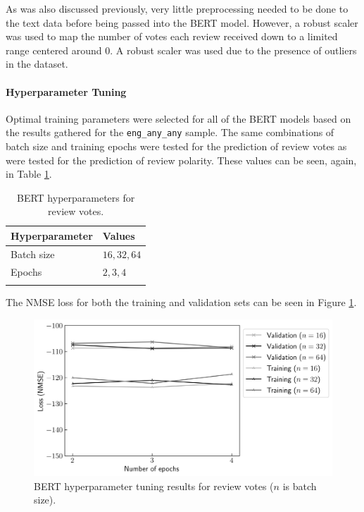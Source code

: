 As was also discussed previously, very little preprocessing needed to be done to the text data before being passed into the BERT model. However, a robust scaler was used to map the number of votes each review received down to a limited range centered around 0. A robust scaler was used due to the presence of outliers in the dataset.

\paragraph{Hyperparameter Tuning}

Optimal training parameters were selected for all of the BERT models based on the results gathered for the \texttt{eng\_any\_any} sample. The same combinations of batch size and training epochs were tested for the prediction of review votes as were tested for the prediction of review polarity. These values can be seen, again, in Table \ref{tab:DI_RF_Votes_BERTHP}.

\begin{table}[ht]
    \centering
    \begin{tabular}{l l}
        \toprule
        \textbf{Hyperparameter} & \textbf{Values}\\\midrule
        Batch size & $16, 32, 64$\\
        Epochs & $2, 3, 4$\\
        \bottomrule\\
    \end{tabular}
    \caption{BERT hyperparameters for review votes.}
    \label{tab:DI_RF_Votes_BERTHP}
\end{table}

The NMSE loss for both the training and validation sets can be seen in Figure \ref{fig:DI_RF_Votes_BERTHP}.

\begin{figure}[ht]
    \centering
    \includegraphics[scale=0.7]{figures/05_impl/01_rfp/02_votes/plot_hyperparams_bert.png}
    \caption{BERT hyperparameter tuning results for review votes ($n$ is batch size).}
    \label{fig:DI_RF_Votes_BERTHP}
\end{figure}

